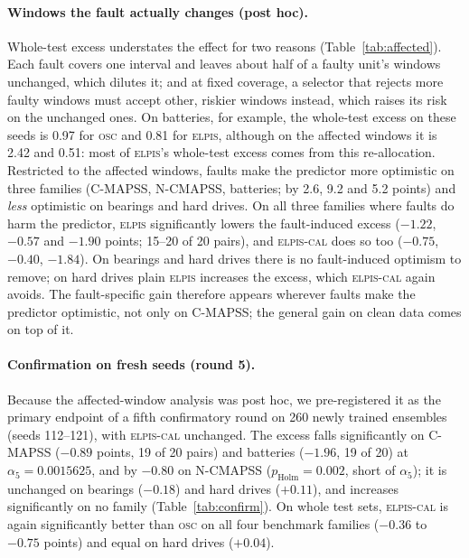 \documentclass{esannV2}
\newcommand{\OSC}{\textsc{osc}}
\newcommand{\RPT}{\textsc{elpis}}
\newcommand{\AUTO}{\textsc{elpis-cal}}
\begin{document}
\paragraph{Windows the fault actually changes (post hoc).} Whole-test excess understates the effect for two reasons (Table~\ref{tab:affected}). Each fault covers one interval and leaves about half of a faulty unit's windows unchanged, which dilutes it; and at fixed coverage, a selector that rejects more faulty windows must accept other, riskier windows instead, which raises its risk on the unchanged ones. On batteries, for example, the whole-test excess on these seeds is 0.97 for \OSC{} and 0.81 for \RPT, although on the affected windows it is 2.42 and 0.51: most of \RPT's whole-test excess comes from this re-allocation. Restricted to the affected windows, faults make the predictor more optimistic on three families (C-MAPSS, N-CMAPSS, batteries; by 2.6, 9.2 and 5.2 points) and \emph{less} optimistic on bearings and hard drives. On all three families where faults do harm the predictor, \RPT{} significantly lowers the fault-induced excess ($-1.22$, $-0.57$ and $-1.90$ points; 15--20 of 20 pairs), and \AUTO{} does so too ($-0.75$, $-0.40$, $-1.84$). On bearings and hard drives there is no fault-induced optimism to remove; on hard drives plain \RPT{} increases the excess, which \AUTO{} again avoids. The fault-specific gain therefore appears wherever faults make the predictor optimistic, not only on C-MAPSS; the general gain on clean data comes on top of it.

\paragraph{Confirmation on fresh seeds (round 5).} Because the affected-window analysis was post hoc, we pre-registered it as the primary endpoint of a fifth confirmatory round on 260 newly trained ensembles (seeds 112--121), with \AUTO{} unchanged. The excess falls significantly on C-MAPSS ($-0.89$ points, 19 of 20 pairs) and batteries ($-1.96$, 19 of 20) at $\alpha_5=0.0015625$, and by $-0.80$ on N-CMAPSS ($p_{\text{Holm}}=0.002$, short of $\alpha_5$); it is unchanged on bearings ($-0.18$) and hard drives ($+0.11$), and increases significantly on no family (Table~\ref{tab:confirm}). On whole test sets, \AUTO{} is again significantly better than \OSC{} on all four benchmark families ($-0.36$ to $-0.75$ points) and equal on hard drives ($+0.04$).
\end{document}
